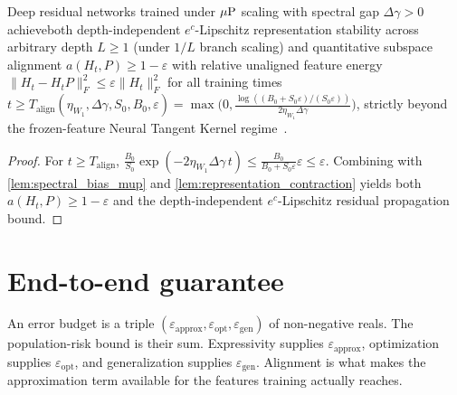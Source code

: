 \begin{conjecture}\label{conj:grand_feature_learning}
\leanok
{}
Deep residual networks trained under $\mu\mathrm{P}$ scaling with spectral gap $\Delta\gamma > 0$ achieveboth depth-independent $e^c$-Lipschitz representation stability across arbitrary depth $L\ge 1$ (under $1/L$ branch scaling) and quantitative subspace alignment $a(H_t, P) \ge 1 - \varepsilon$ with relative unaligned feature energy $\lVert H_t - H_t P\rVert_F^2 \le \varepsilon\lVert H_t\rVert_F^2$ for all training times $t \ge T_{\mathrm{align}}(\eta_{W_1}, \Delta\gamma, S_0, B_0, \varepsilon) = \max\bigl(0, \frac{\log((B_0 + S_0\varepsilon)/(S_0\varepsilon))}{2\eta_{W_1}\Delta\gamma}\bigr)$, strictly beyond the frozen-feature Neural Tangent Kernel regime~\cite{jacot2018neural,arora2019exact}.
\end{conjecture}
\begin{proof}
\leanok
For $t \ge T_{\mathrm{align}}$, $\frac{B_0}{S_0}\exp(-2\eta_{W_1}\Delta\gamma\,t) \le \frac{B_0}{B_0 + S_0\varepsilon}\varepsilon \le \varepsilon$. Combining with \cref{lem:spectral_bias_mup} and \cref{lem:representation_contraction} yields both $a(H_t, P) \ge 1 - \varepsilon$ and the depth-independent $e^c$-Lipschitz residual propagation bound.
\end{proof}

\chapter{End-to-end guarantee}

\begin{definition}\label{def:end_to_end}
\leanok
{}
An error budget is a triple $(\varepsilon_{\mathrm{approx}},\varepsilon_{\mathrm{opt}},\varepsilon_{\mathrm{gen}})$ of non-negative reals. The population-risk bound is their sum. Expressivity supplies $\varepsilon_{\mathrm{approx}}$, optimization supplies $\varepsilon_{\mathrm{opt}}$, and generalization supplies $\varepsilon_{\mathrm{gen}}$. Alignment is what makes the approximation term available for the features training actually reaches.
\end{definition}

